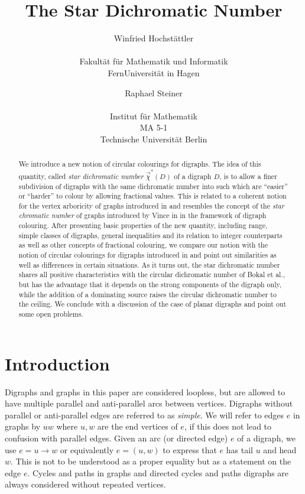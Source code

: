 \documentclass[fontsize=11pt,a4paper,DIV12]{scrartcl}
\title{The Star Dichromatic Number%
}
\author{
\parbox{7cm}{\center
{\SC Winfried Hochst\"attler%
\\[3pt]
\normalsize
\email{winfried.hochstaettler@fernuni-hagen.de}\\
\small
        {Fakult\"at f\"ur Mathematik und Informatik\\
         FernUniversit\"at in Hagen}}}
\and\hspace{-0.3cm}
\parbox{7cm}{\center
{\SC Raphael Steiner
\\[3pt]
\normalsize
\email{steiner@math.tu-berlin.de}\\
\small
        {Institut f\"ur Mathematik\\
        MA 5-1 \\
         Technische Universit\"{a}t Berlin}}}
}%
\def\style{}
\theoremstyle{meiner}
\theoremstyle{definition}
\begin{document}

\maketitle

\begin{abstract}
  We introduce a new notion of circular colourings for digraphs. The
  idea of this quantity, called \emph{star dichromatic number}
  $\vec{\chi}^\ast(D)$ of a digraph $D$, is to allow a finer
  subdivision of digraphs with the same dichromatic number into such
  which are ``easier'' or ``harder'' to colour by allowing fractional
  values. This is related to a coherent notion for the vertex
  arboricity of graphs introduced in \cite{fracvert} and resembles the
  concept of the \emph{star chromatic number} of graphs introduced by
  Vince in \cite{vince} in the framework of digraph colouring. After
  presenting basic properties of the new quantity, including range,
  simple classes of digraphs, general inequalities and its relation to
  integer counterparts as well as other concepts of fractional
  colouring, we compare our notion with the notion of circular
  colourings for digraphs introduced in \cite{bokal} and point out
  similarities as well as differences in certain situations. As it
  turns out, the star dichromatic number shares all positive
  characteristics with the circular dichromatic number of Bokal et
  al., but has the advantage that it depends on the strong
  components of the digraph only, while the addition of a dominating
  source raises the circular dichromatic number to the ceiling. We
  conclude with a discussion of the case of planar digraphs and point
  out some open problems.
\end{abstract}


\section{Introduction}
Digraphs and graphs in this paper are considered loopless, but are allowed to have multiple parallel and anti-parallel arcs between vertices. Digraphs without parallel or anti-parallel edges are referred to as \emph{simple}. We will refer to edges $e$ in graphs by $uw$ where $u,w$ are the end vertices of $e$, if this does not lead to confusion with parallel edges. Given an arc (or directed edge) $e$ of a digraph, we use $e=u \rightarrow w$ or equivalently $e=(u,w)$ to express that $e$ has tail $u$ and head $w$. This is not to be understood as a proper equality but as a statement on the edge $e$. Cycles and paths in graphs and directed cycles and paths digraphs are always considered without repeated vertices.
\end{document}
